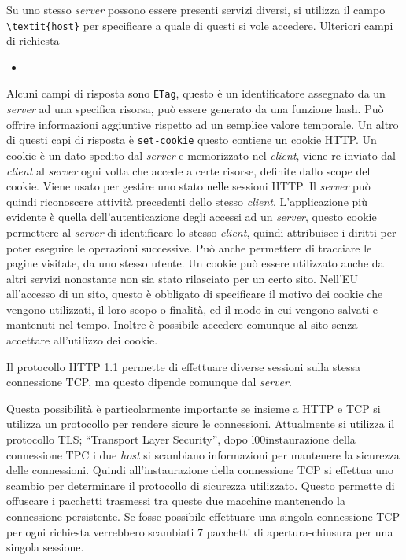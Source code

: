 \documentclass{article}
\numberwithin{equation}{subsection}
\begin{document}
Su uno stesso \textit{server} possono essere presenti servizi diversi, si utilizza il campo \verb|\textit{host}| per specificare a quale di questi si vole accedere. 
Ulteriori campi di richiesta
\begin{itemize}
    \item 
\end{itemize}


Alcuni campi di risposta sono \verb|ETag|, questo è un identificatore assegnato da un \textit{server} ad una specifica risorsa, può essere generato da una funzione hash. Può 
offrire informazioni aggiuntive rispetto ad un semplice valore temporale. 
Un altro di questi capi di risposta è \verb|set-cookie| questo contiene un cookie \textcolor{NavyBlue}{HTTP}. 
Un cookie è un dato spedito dal \textit{server} e memorizzato nel \textit{client}, viene re-inviato dal \textit{client} al \textit{server} ogni volta che accede a certe risorse, definite dallo scope del cookie. 
Viene usato per gestire uno stato nelle sessioni \textcolor{NavyBlue}{HTTP}. Il \textit{server} può quindi riconoscere attività precedenti dello stesso \textit{client}. 
L'applicazione più evidente è quella dell'autenticazione degli accessi ad un \textit{server}, questo cookie permettere al \textit{server} di identificare lo stesso \textit{client}, quindi attribuisce 
i diritti per poter eseguire le operazioni successive. 
Può anche permettere di tracciare le pagine visitate, da uno stesso utente. Un cookie può essere utilizzato anche da altri servizi nonostante non sia stato rilasciato per 
un certo sito. Nell'EU all'accesso di un sito, questo è obbligato di specificare il motivo dei cookie che vengono utilizzati, il loro scopo o finalità, ed il modo in cui 
vengono salvati e mantenuti nel tempo. Inoltre è possibile accedere comunque al sito senza accettare all'utilizzo dei cookie. 

Il protocollo \textcolor{NavyBlue}{HTTP} 1.1 permette di effettuare diverse sessioni sulla stessa 
connessione \textcolor{Bittersweet}{TCP}, ma questo dipende comunque dal \textit{server}. 

Questa possibilità è particolarmente importante se insieme a \textcolor{NavyBlue}{HTTP} e \textcolor{Bittersweet}{TCP} si 
utilizza un protocollo per rendere sicure le connessioni. Attualmente si utilizza il 
protocollo TLS; ``Transport Layer Security'', dopo l00instaurazione della 
connessione TPC i due \textit{host} si scambiano informazioni per mantenere la sicurezza delle connessioni. Quindi all'instaurazione della connessione \textcolor{Bittersweet}{TCP} si effettua uno 
scambio per determinare il protocollo di sicurezza utilizzato. Questo permette di offuscare i pacchetti trasmessi tra queste due macchine mantenendo la connessione 
persistente. 
Se fosse possibile effettuare una singola connessione \textcolor{Bittersweet}{TCP} per ogni richiesta verrebbero scambiati 7 pacchetti di apertura-chiusura per una singola sessione. 
\end{document}
